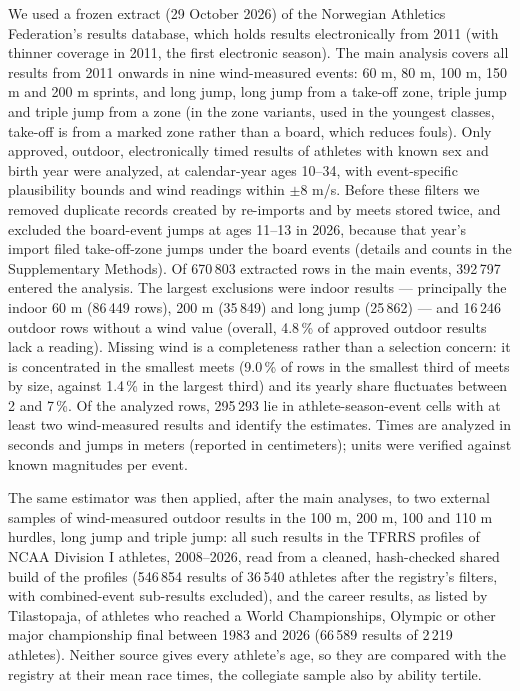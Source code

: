 \documentclass[12pt,a4paper]{article}
\begin{document}
We used a frozen extract (29 October 2026) of the Norwegian Athletics Federation's results database, which holds results electronically from 2011 (with thinner coverage in 2011, the first electronic season). The main analysis covers all results from 2011 onwards in nine wind-measured events: 60 m, 80 m, 100 m, 150 m and 200 m sprints, and long jump, long jump from a take-off zone, triple jump and triple jump from a zone (in the zone variants, used in the youngest classes, take-off is from a marked zone rather than a board, which reduces fouls). Only approved, outdoor, electronically timed results of athletes with known sex and birth year were analyzed, at calendar-year ages 10--34, with event-specific plausibility bounds and wind readings within $\pm$8 m/s. Before these filters we removed duplicate records created by re-imports and by meets stored twice, and excluded the board-event jumps at ages 11--13 in 2026, because that year's import filed take-off-zone jumps under the board events (details and counts in the Supplementary Methods). Of 670\,803 extracted rows in the main events, 392\,797 entered the analysis. The largest exclusions were indoor results --- principally the indoor 60 m (86\,449 rows), 200 m (35\,849) and long jump (25\,862) --- and 16\,246 outdoor rows without a wind value (overall, 4.8\,\% of approved outdoor results lack a reading). Missing wind is a completeness rather than a selection concern: it is concentrated in the smallest meets (9.0\,\% of rows in the smallest third of meets by size, against 1.4\,\% in the largest third) and its yearly share fluctuates between 2 and 7\,\%. Of the analyzed rows, 295\,293 lie in athlete-season-event cells with at least two wind-measured results and identify the estimates. Times are analyzed in seconds and jumps in meters (reported in centimeters); units were verified against known magnitudes per event.

The same estimator was then applied, after the main analyses, to two external samples of wind-measured outdoor results in the 100 m, 200 m, 100 and 110 m hurdles, long jump and triple jump: all such results in the TFRRS profiles of NCAA Division I athletes, 2008--2026, read from a cleaned, hash-checked shared build of the profiles (546\,854 results of 36\,540 athletes after the registry's filters, with combined-event sub-results excluded), and the career results, as listed by Tilastopaja, of athletes who reached a World Championships, Olympic or other major championship final between 1983 and 2026 (66\,589 results of 2\,219 athletes). Neither source gives every athlete's age, so they are compared with the registry at their mean race times, the collegiate sample also by ability tertile.
\end{document}
